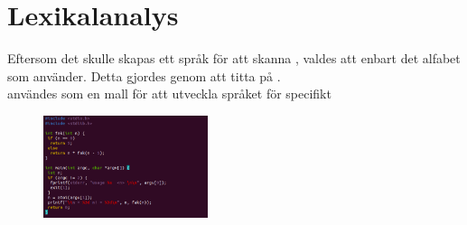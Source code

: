 \section{Lexikalanalys}

Eftersom det skulle skapas ett språk för att skanna , valdes att enbart det alfabet
som  använder. Detta gjordes genom att titta på .
\\  användes som en mall för att utveckla språket för specifikt  

\begin{figure}[!h]
    \includegraphics[width=\linewidth,height=3cm]{bilder/fak.c.png}
    \label{fig:fak.c}
\end{figure}

